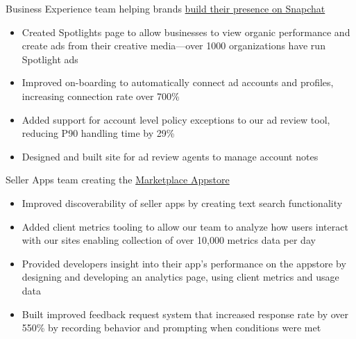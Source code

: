 \documentclass[11pt,letterpaper,ragged2e,withhyper]{altacv}
\newif\ifbubbles
\begin{document}
\begin{paracol}{2}
\switchcolumn

\vspace{0.7ex}

\par Business Experience team helping brands \href{https://forbusiness.snapchat.com/}{\color{accent} build their presence on Snapchat}
\smallskip
\begin{itemize}
    \item Created Spotlights page to allow businesses to view organic performance and create ads from their creative media---over 1000 organizations have run Spotlight ads
    \item Improved on-boarding to automatically connect ad accounts and profiles, increasing connection rate over 700\%
    \item Added support for account level policy exceptions to our ad review tool, reducing P90 handling time by 29\%
    \item Designed and built site for ad review agents to manage account notes
\end{itemize}

\ifbubbles
    \cvtag{TypeScript}
    \cvtag{React}
    \cvtag{GraphQL}
    \cvtag{Kotlin}
    \cvtag{Redux}
    \cvtag{GCP}
    \cvtag{Jest}
    \cvtag{Enzyme}
\fi

\divider

\par Seller Apps team creating the \href{https://sellercentral.amazon.com/apps/store}{\color{accent} Marketplace Appstore}
\smallskip
\begin{itemize}
    \item Improved discoverability of seller apps by creating text search functionality
    \item Added client metrics tooling to allow our team to analyze how users interact with our sites enabling collection of over 10,000 metrics data per day
    \item Provided developers insight into their app's performance on the appstore by designing and developing an analytics page, using client metrics and usage data
    \item Built improved feedback request system that increased response rate by over 550\% by recording behavior and prompting when conditions were met
\end{itemize}


\end{paracol}
\end{document}
